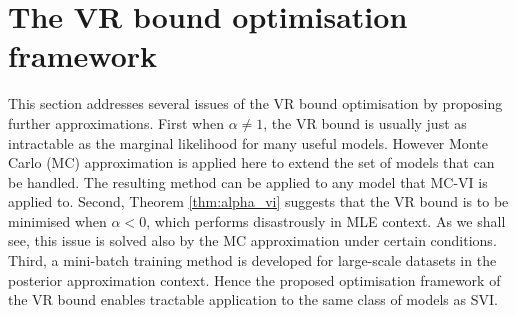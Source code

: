 \section{The VR bound optimisation framework}
This section addresses several issues of the VR bound optimisation by proposing further approximations. First when $\alpha \neq 1$, the VR bound is usually just as intractable as the marginal likelihood for many useful models. However Monte Carlo (MC) approximation is applied here to extend the set of models that can be handled. The resulting method can be applied to any model that MC-VI \cite{paisley:bbvi, salimans:reparam, ranganath:bbvi, kucukelbir:vi_stan} is applied to.
%
Second, Theorem \ref{thm:alpha_vi} suggests that the VR bound is to be minimised when $\alpha < 0$, which performs disastrously in MLE context. As we shall see, this issue is solved also by the MC approximation under certain conditions. Third, a mini-batch training method is developed for large-scale datasets in the posterior approximation context. Hence the proposed optimisation framework of the VR bound enables tractable application to the same class of models as SVI.

